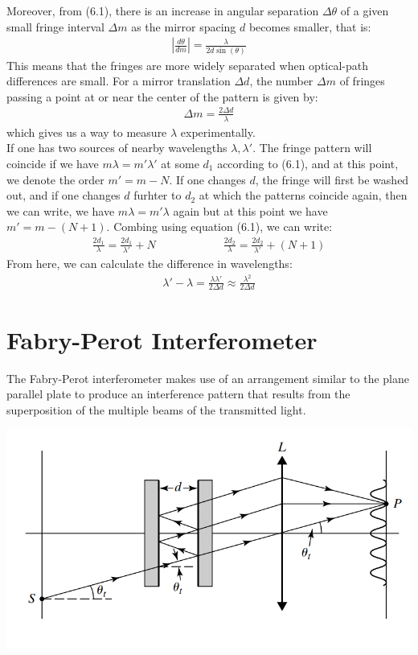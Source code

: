 \documentclass[11pt]{book}
\theoremstyle{break}
\theoremstyle{break}
\begin{document}
Moreover, from (6.1), there is an increase in angular separation $\Delta \theta$ of a given small fringe interval $\Delta m$ as the mirror spacing $d$ becomes smaller, that is:
\begin{align*}
\left|\frac{d\theta}{dm}\right| = \frac{\lambda}{2d\sin(\theta)}
\end{align*}
This means that the fringes are more widely separated when optical-path differences are small. For a mirror translation $\Delta d$, the number $\Delta m$ of fringes passing a point at or near the center of the pattern is given by:
\begin{align*}
\Delta m = \frac{2\Delta d}{\lambda}
\end{align*}
which gives us a way to measure $\lambda$ experimentally. \\

If one has two sources of nearby wavelengths $\lambda, \lambda'$. The fringe pattern will coincide if we have $m\lambda = m'\lambda'$ at some $d_1$ according to (6.1), and at this point, we denote the order $m' = m-N$. If one changes $d$, the fringe will first be washed out, and if one changes $d$ furhter to $d_2$ at which the patterns coincide again, then we can write, we have $m\lambda = m'\lambda$ again but at this point we have $m' = m-(N+1)$. Combing using equation (6.1), we can write:
\begin{align*}
\frac{2d_1}{\lambda} = \frac{2d_1}{\lambda'} + N \qquad\qquad\qquad \frac{2d_2}{\lambda} = \frac{2d_2}{\lambda'}+(N+1)
\end{align*} 
From here, we can calculate the difference in wavelengths:
\begin{align*}
\lambda' - \lambda = \frac{\lambda\lambda'}{2\Delta d} \approx \frac{\lambda^2}{2\Delta d}
\end{align*}

\newpage
\section[Fabry-Perot Interferometer]{\color{red} Fabry-Perot Interferometer\color{black}}
The Fabry-Perot interferometer makes use of an arrangement similar to the
plane parallel plate to produce an interference pattern that results from the superposition of the multiple beams of the transmitted light.
\begin{center}
\includegraphics[scale=0.55]{fbCavity.png}
\end{center}
\end{document}
